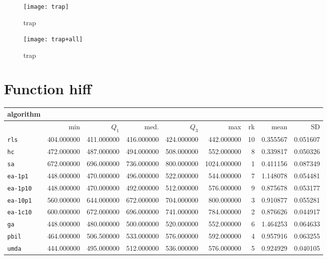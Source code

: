 \begin{center}
\begin{figure}[h]
\centering
\texttt{[image: trap]}
\caption{trap}
\end{figure}
\end{center}

\begin{center}
\begin{figure}[h]
\centering
\texttt{[image: trap+all]}
\caption{trap}
\end{figure}
\end{center}

\newpage

\section{Function hiff}
\begin{center}
\begin{tabular}{@{}l*{5}{>{{}}N{3}{0}}>{{}}N{2}{0}N{1}{3}N{1}{3}@{}}
\toprule
{algorithm} &  &  \\
\midrule
& {min} & {$Q_1$} & {med.} & {$Q_3$} & {max} & {rk} & {mean} & {SD} \\
\midrule
\verb|rls| & 404.000000 & 411.000000 & 416.000000 & 424.000000 & 442.000000 & 10 & 0.355567 & 0.051607 \\
 \verb|hc| & 472.000000 & 487.000000 & 494.000000 & 508.000000 & 552.000000 & 8 & 0.339817 & 0.050326 \\
 \verb|sa| & {\color{blue}} 672.000000 & {\color{blue}} 696.000000 & {\color{blue}} 736.000000 & {\color{blue}} 800.000000 & {\color{blue}} 1024.000000 & 1 & 0.411156 & 0.087349 \\
 \verb|ea-1p1| & 448.000000 & 470.000000 & 496.000000 & 522.000000 & 544.000000 & 7 & 1.148078 & 0.054481 \\
 \verb|ea-1p10| & 448.000000 & 470.000000 & 492.000000 & 512.000000 & 576.000000 & 9 & 0.875678 & 0.053177 \\
 \verb|ea-10p1| & 560.000000 & 644.000000 & 672.000000 & 704.000000 & 800.000000 & 3 & 0.910877 & 0.055281 \\
 \verb|ea-1c10| & 600.000000 & 672.000000 & 696.000000 & 741.000000 & 784.000000 & 2 & 0.876626 & 0.044917 \\
 \verb|ga| & 448.000000 & 480.000000 & 500.000000 & 520.000000 & 552.000000 & 6 & 1.464253 & 0.064633 \\
 \verb|pbil| & 464.000000 & 506.500000 & 533.000000 & 576.000000 & 592.000000 & 4 & 0.957916 & 0.063255 \\
 \verb|umda| & 444.000000 & 495.000000 & 512.000000 & 536.000000 & 576.000000 & 5 & 0.924929 & 0.040105 \\
 \bottomrule
\end{tabular}
\end{center}

